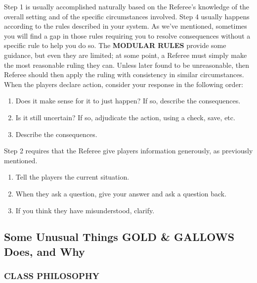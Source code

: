 \documentclass[twoside]{article}
\begin{document}
\bigbreak

Step 1 is usually accomplished naturally based on the Referee's knowledge of the overall setting and of the specific circumstances involved. Step 4 usually happens according to the rules described in your system. As we've mentioned, sometimes you will find a gap in those rules requiring you to resolve consequences without a specific rule to help you do so. The \textbf{MODULAR RULES} provide some guidance, but even they are limited; at some point, a Referee must simply make the most reasonable ruling they can. Unless later found to be unreasonable, then Referee should then apply the ruling with consistency in similar circumstances. When the players declare action, consider your response in the following order:

\bigbreak

\begin{enumerate}[nosep]
\item Does it make sense for it to just happen? If so, describe the consequences.
\item Is it still uncertain? If so, adjudicate the action, using a check, save, etc.
\item Describe the consequences.
\end{enumerate}

\bigbreak

Step 2 requires that the Referee give players information generously, as previously mentioned.

\bigbreak

\begin{enumerate}[nosep]
\item Tell the players the current situation.
\item When they ask a question, give your answer and ask a question back.
\item If you think they have misunderstood, clarify.
\end{enumerate}

\subsection*{Some Unusual Things \textbf{GOLD \& GALLOWS} Does, and Why}

\subsubsection*{\footnotesize{C}\scriptsize{LASS PHILOSOPHY}\normalsize}
\end{document}

